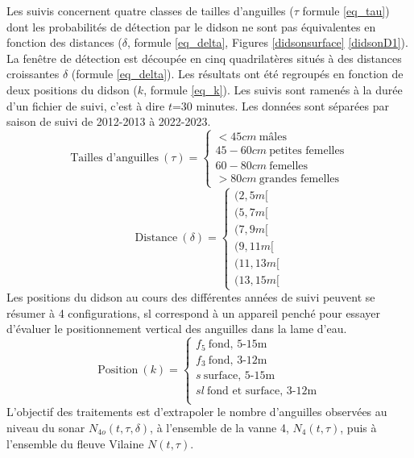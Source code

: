 \documentclass[11pt,twocolumn,titlepage,twoside]{article}
\begin{document}
Les suivis concernent quatre classes de tailles d'anguilles ($\tau$ formule \ref{eq_tau}) dont les probabilités de détection par le didson ne sont pas
équivalentes en fonction des distances ($\delta$, formule \ref{eq_delta}, Figures
\ref{didsonsurface} \ref{didsonD1}).
La fenêtre de détection est découpée en cinq quadrilatères situés à des
distances croissantes $\delta$ (formule \ref{eq_delta}).
Les résultats ont été regroupés en fonction de deux positions du didson ($k$, formule
\ref{eq_k}). Les suivis sont ramenés à la durée d'un fichier de suivi, c'est à dire $t$=30 minutes.
Les données sont séparées par saison de suivi de 2012-2013 à 2022-2023.
\begin{equation}
  \label{eq_tau}
  \text{Tailles d'anguilles}~(\tau)=
  \begin{cases}
      <45cm~\text{mâles}\\
      45-60cm~\text{petites femelles}\\
      60-80cm~\text{femelles}\\
      >80cm~\text{grandes femelles}
  \end{cases}
\end{equation}
\begin{equation}
  \label{eq_delta}
  \text{Distance}~(\delta)=
  \begin{cases}
      (2,5m[\\
      (5,7m[\\
      (7,9m[\\
      (9,11m[\\
      (11,13m[\\
      (13,15m[      
  \end{cases}
\end{equation}
Les positions du didson au cours des différentes années de suivi peuvent se
résumer à 4 configurations,  sl correspond à un appareil penché pour essayer
d'évaluer le positionnement vertical des anguilles dans la lame d'eau.
\begin{equation}
  \label{eq_k}
  \text{Position}~(k)=
  \begin{cases}
      f_{5}~\text{fond, 5-15m}\\
      f_{3}~\text{fond, 3-12m}\\      
      s~\text{surface, 5-15m}\\
      sl~\text{fond et surface, 3-12m}\\
  \end{cases}
 \end{equation}
L'objectif des traitements est
d'extrapoler le nombre d'anguilles observées au niveau du sonar
$N_{4o}(t,\tau,\delta)$, à l'ensemble de la vanne 4, $N_4(t,\tau)$, puis à 
l'ensemble du fleuve Vilaine $N(t,\tau)$. 
\end{document}
